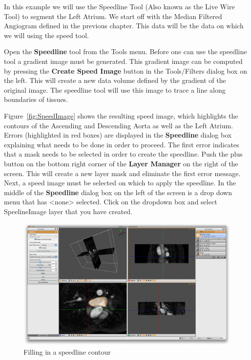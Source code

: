 \documentclass[fleqn,11pt,openany]{book}
\begin{document}
In this example we will use the Speedline Tool (Also known as the Live Wire Tool) to segment the Left Atrium. We start off with the Median Filtered Angiogram defined in the previous chapter. This data will be the data on which we will using the speed tool.

Open  the {\bf Speedline} tool from the Tools menu. Before one can use the speedline tool a gradient image must be generated. This gradient image can be computed by pressing the {\bf Create Speed Image} button in the Tools/Filters dialog box on the left. This will create a new data volume defined by the gradient of the original image. The speedline tool will use this image to trace a line along boundaries of tissues.

Figure~\ref{fig:SpeedImage} shows the resulting speed image, which highlights the contours of the Ascending and Descending Aorta as well as the Left Atrium. Errors (highlighted in red boxes) are displayed in the {\bf Speedline} dialog box explaining what needs to be done in order to proceed.  The first error indicates that a mask needs to be selected in order to create the speedline.  Push the plus button on the bottom right corner of the {\bf Layer Manager} on the right of the screen.  This will create a new layer mask and eliminate the first error message.  Next, a speed image must be selected on which to apply the speedline.  In the middle of the {\bf Speedline} dialog box on the left of the screen is a drop down menu that has <none> selected.  Click on the dropdown box and select SpeelineImage layer that you have created.

\begin{figure}
\includegraphics[width=\textwidth]{Seg3DTutorial_figures/SpeedlineFill.png}
\caption{Filling in a speedline contour}\label{fig:SpeedLine2}
\end{figure}
\end{document}
